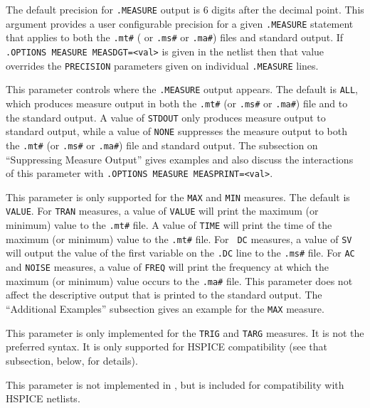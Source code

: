 \begin{Command}
\begin{Arguments}
The default precision for {\tt .MEASURE} output is 6 digits after the
decimal point.  This argument provides a user configurable precision
for a given {\tt .MEASURE} statement that applies to both
the \texttt{.mt\#} ( or \texttt{.ms\#} or \texttt{.ma\#}) files and
standard output.  If \texttt{.OPTIONS MEASURE MEASDGT=<val>} is given
in the netlist then that value overrides the \texttt{PRECISION}
parameters given on individual \texttt{.MEASURE} lines.


This parameter controls where the {\tt .MEASURE} output appears.  The
default is {\tt ALL}, which produces measure output in both
the \texttt{.mt\#} (or \texttt{.ms\#} or
\texttt{.ma\#}) file and to the standard output.  A value of
{\tt STDOUT} only produces measure output to standard output, while a
value of {\tt NONE} suppresses the measure output to both
the \texttt{.mt\#} (or \texttt{.ms\#} or \texttt{.ma\#}) file and
standard output.  The subsection on ``Suppressing Measure Output''
gives examples and also discuss the interactions of this parameter
with \texttt{.OPTIONS MEASURE MEASPRINT=<val>}.


This parameter is only supported for the {\tt MAX} and {\tt MIN}
measures.  The default is {\tt VALUE}.  For {\tt TRAN} measures, a
value of {\tt VALUE} will print the maximum (or minimum) value to
the \texttt {.mt\#} file.  A value of {\tt TIME} will print the time
of the maximum (or minimum) value to the \texttt{.mt\#} file. For {\tt
DC} measures, a value of {\tt SV} will output the value of the first
variable on the {\tt .DC} line to the \texttt{.ms\#} file.  For {\tt AC}
and {\tt NOISE} measures, a value of {\tt FREQ} will print the frequency
at which the maximum (or minimum) value occurs to the \texttt{.ma\#} file.
This parameter does not affect the descriptive output that is printed
to the standard output.  The ``Additional Examples'' subsection gives
an example for the {\tt MAX} measure.

This parameter is only implemented for the {\tt TRIG} and {\tt TARG}
measures.  It is not the preferred \Xyce{} syntax. It is only
supported for HSPICE compatibility (see that subsection, below, for
details).


This parameter is not implemented in \Xyce{}, but is included for compatibility
with HSPICE netlists.



\end{Arguments}
\end{Command}
